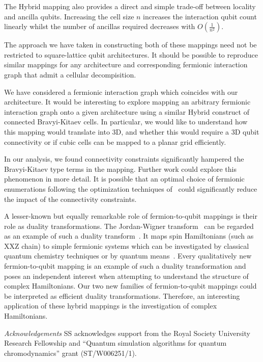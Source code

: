 \documentclass[pdftex,pra,aps,twocolumn,twoside]{revtex4-1}
\theoremstyle{plain}
\theoremstyle{note}
\newcommand\+{{\footnotesize \raisebox{0.3ex}{+}}}
\begin{document}
The Hybrid\+ mapping also provides a direct and simple trade-off between locality and ancilla qubits. Increasing the cell size $n$ increases the interaction qubit count linearly whilst the number of ancillas required decreases with $O(\frac{1}{n^2})$.

The approach we have taken in constructing both of these mappings need not be restricted to square-lattice qubit architectures. It should be possible to reproduce similar mappings for any architecture and corresponding fermionic interaction graph that admit a cellular decompisition.

We have considered a fermionic interaction graph which coincides with our architecture. It would be interesting to explore mapping an arbitrary fermionic interaction graph onto a given architecture using a similar Hybrid construct of connected Bravyi-Kitaev cells. In particular, we would like to understand how this mapping would translate into 3D, and whether this would require a 3D qubit connectivity or if cubic cells can be mapped to a planar grid efficiently.

In our analysis, we found connectivity constraints significantly hampered the Bravyi-Kitaev type terms in the mapping. Further work could explore this phenomenon in more detail. It is possible that an optimal choice of fermionic enumerations following the optimization techniques of~\cite{chiew2021optimal} could significantly reduce the impact of the connectivity constraints.

A lesser-known but equally remarkable role of fermion-to-qubit mappings is their role as duality transformations. The Jordan-Wigner transform~\cite{jordan1993paulische} can be regarded as an example of such a duality transform~\cite{henderson2022strong}. It maps spin Hamiltonians (such as XXZ chain) to simple fermionic systems which can be investigated by classical quantum chemistry techniques or by quantum means~\cite{nishimori2010elements,cao2019quantum}. Every qualitatively new fermion-to-qubit mapping is an example of such a duality transformation and poses an independent interest when attempting to understand the structure of complex Hamiltonians. Our two new families of fermion-to-qubit mappings could be interpreted as efficient duality transformations. Therefore, an interesting application of these hybrid mappings is the investigation of complex Hamiltonians.

{\it Acknowledgements} SS acknowledges support from the Royal Society University Research Fellowship and ``Quantum simulation algorithms for quantum chromodynamics'' grant (ST/W006251/1).
\end{document}

